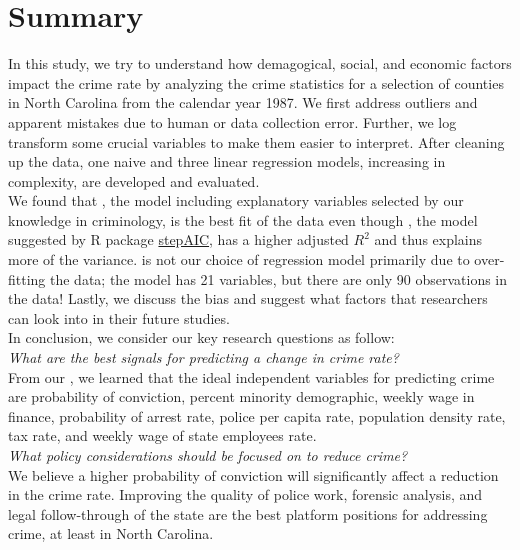 \pagebreak

\section{Summary}

In this study, we try to understand how demagogical, social, and economic factors impact the crime rate by analyzing the crime statistics for a selection of counties in North Carolina from the calendar year 1987. We first address outliers and apparent mistakes due to human or data collection error.  Further, we log transform some crucial variables to make them easier to interpret. After cleaning up the data, one naive and three linear regression models, increasing in complexity, are developed and evaluated. \\

We found that , the model including explanatory variables selected by our knowledge in criminology, is the best fit of the data even though , the model suggested by R package \href{https://www.rdocumentation.org/packages/MASS/versions/7.3-51.4/topics/stepAIC}{stepAIC}, has a higher adjusted $R^2$ and thus explains more of the variance.  is not our choice of regression model primarily due to over-fitting the data; the model has 21 variables, but there are only 90 observations in the data! Lastly, we discuss the  bias and suggest what factors that researchers can look into in their future studies. \\

In conclusion, we consider our key research questions as follow:\\

\textit{What are the best signals for predicting a change in crime rate?}\\

From our , we learned that the ideal independent variables for predicting crime are probability of conviction, percent minority demographic, weekly wage in finance, probability of arrest rate, police per capita rate, population density rate, tax rate, and weekly wage of state employees rate.\\

\textit{What policy considerations should be focused on to reduce crime?}\\

We believe a higher probability of conviction will significantly affect a reduction in the crime rate.  Improving the quality of police work, forensic analysis, and legal follow-through of the state are the best platform positions for addressing crime, at least in North Carolina.

